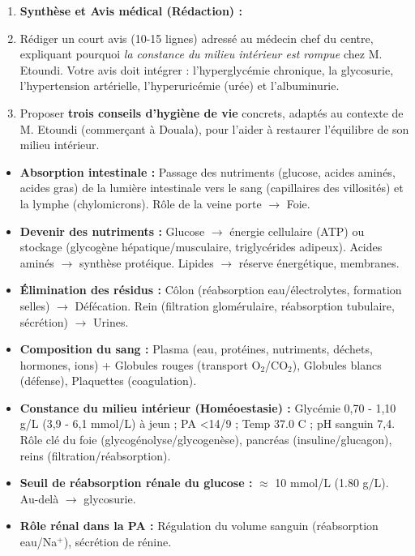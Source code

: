 \documentclass[11pt]{article}
\newcounter{popsec}
\newcounter{popsub}
\newcommand{\courssub}[1]{%
  \stepcounter{popsub}%
  \par\vspace{9pt}\noindent{\popxbold\fontsize{11.5}{13}\selectfont\color{popink}{\color{poporange}\thepopsec.\thepopsub}\hspace{6pt}#1}\par\nopagebreak\vspace{4pt}
}
\begin{document}
\begin{enumerate}
\begin{enumerate}
    \end{enumerate}
    \item \textbf{Synthèse et Avis médical (Rédaction) :}
    \item Rédiger un court avis (10-15 lignes) adressé au médecin chef du centre, expliquant pourquoi \emph{la constance du milieu intérieur est rompue} chez M. Etoundi. Votre avis doit intégrer : l'hyperglycémie chronique, la glycosurie, l'hypertension artérielle, l'hyperuricémie (urée) et l'albuminurie.
    \item Proposer \textbf{trois conseils d'hygiène de vie} concrets, adaptés au contexte de M. Etoundi (commerçant à Douala), pour l'aider à restaurer l'équilibre de son milieu intérieur.
\end{enumerate}

\courssub{Ressources à mobiliser}
\begin{itemize}
    \item \textbf{Absorption intestinale :} Passage des nutriments (glucose, acides aminés, acides gras) de la lumière intestinale vers le sang (capillaires des villosités) et la lymphe (chylomicrons). Rôle de la veine porte $\to$ Foie.
    \item \textbf{Devenir des nutriments :} Glucose $\to$ énergie cellulaire (ATP) ou stockage (glycogène hépatique/musculaire, triglycérides adipeux). Acides aminés $\to$ synthèse protéique. Lipides $\to$ réserve énergétique, membranes.
    \item \textbf{Élimination des résidus :} Côlon (réabsorption eau/électrolytes, formation selles) $\to$ Défécation. Rein (filtration glomérulaire, réabsorption tubulaire, sécrétion) $\to$ Urines.
    \item \textbf{Composition du sang :} Plasma (eau, protéines, nutriments, déchets, hormones, ions) + Globules rouges (transport O$_2$/CO$_2$), Globules blancs (défense), Plaquettes (coagulation).
    \item \textbf{Constance du milieu intérieur (Homéoestasie) :} Glycémie \num{0,70 - 1,10} g/L (\num{3,9 - 6,1} mmol/L) à jeun ; PA \textless 14/9 ; Temp \num{37,0} \textdegree C ; pH sanguin 7,4. Rôle clé du foie (glycogénolyse/glycogenèse), pancréas (insuline/glucagon), reins (filtration/réabsorption).
    \item \textbf{Seuil de réabsorption rénale du glucose :} $\approx$ \num{10} mmol/L (\num{1,80} g/L). Au-delà $\to$ glycosurie.
    \item \textbf{Rôle rénal dans la PA :} Régulation du volume sanguin (réabsorption eau/Na$^+$), sécrétion de rénine.
\end{itemize}
\end{document}
